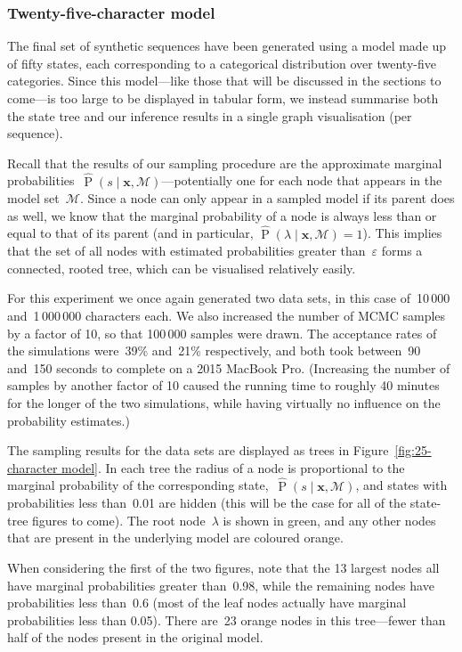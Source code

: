 \documentclass[11pt,a4paper]{article}
\newcommand\mc[1]{\mathcal{#1}}               %
\newcommand\ub[1]{\symbf{#1}}                 %
\DeclareMathOperator\Pb{P}                    %
\begin{document}
\subsubsection{Twenty-five-character model} %

The final set of synthetic sequences have been generated using a model made up
of fifty states, each corresponding to a categorical distribution over
twenty-five categories. Since this model---like those that will be discussed in
the sections to come---is too large to be displayed in tabular form, we instead
summarise both the state tree and our inference results in a single graph
visualisation (per sequence).

Recall that the results of our sampling procedure are the approximate marginal
probabilities~\(\hat{\Pb}(s \mid \ub{x}, \mc{M})\)---potentially one for each
node that appears in the model set~\(\mc{M}\). Since a node can only appear in a
sampled model if its parent does as well, we know that the marginal probability
of a node is always less than or equal to that of its parent (and in particular,
\(\hat{\Pb}(\lambda \mid \ub{x}, \mc{M}) = 1\)). This implies that the set of
all nodes with estimated probabilities greater than~\(\varepsilon\) forms a
connected, rooted tree, which can be visualised relatively easily.

For this experiment we once again generated two data sets, in this case
of~10\,000 and~1\,000\,000 characters each. We also increased the number of MCMC
samples by a factor of 10, so that 100\,000 samples were drawn. The acceptance
rates of the simulations were~39\% and~21\% respectively, and both took
between~90 and~150 seconds to complete on a 2015 MacBook Pro. (Increasing the
number of samples by another factor of 10 caused the running time to roughly 40
minutes for the longer of the two simulations, while having virtually no
influence on the probability estimates.)

The sampling results for the data sets are displayed as trees in
Figure~\ref{fig:25-character model}. In each tree the radius of a node is
proportional to the marginal probability of the corresponding
state,~\(\hat{\Pb}(s \mid \ub{x}, \mc{M})\), and states with probabilities less
than~0.01 are hidden (this will be the case for all of the state-tree figures to
come). The root node~\(\lambda\) is shown in green, and any other nodes that are
present in the underlying model are coloured orange.

When considering the first of the two figures, note that the 13 largest nodes
all have marginal probabilities greater than~0.98, while the remaining nodes
have probabilities less than~0.6 (most of the leaf nodes actually have marginal
probabilities less than 0.05). There are~23 orange nodes in this tree---fewer
than half of the nodes present in the original model.
\end{document}
